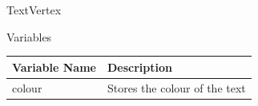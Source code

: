 \documentclass[../../Main.tex]{subfiles}
\begin{document}
    TextVertex
    \begin{center}
        Variables
        \begin{tabular}{ | m{} | m{} | }
            \hline
            \textbf{Variable Name} & \textbf{Description} \\
            \hline
            colour & Stores the colour of the text \\
            \hline
        \end{tabular}
    \end{center}
\end{document}
